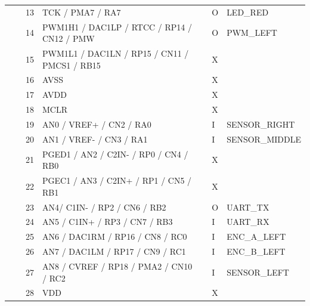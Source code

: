 \begin{table}[]
\begin{tabular}{
>{\columncolor[HTML]{B7B7B7}}c 
>{\columncolor[HTML]{EFEFEF}}c rllll}
\cellcolor[HTML]{B7B7B7} & \cellcolor[HTML]{EFEFEF} & 13 & TCK / PMA7 / RA7 & \cellcolor[HTML]{999999} & O & LED\_RED \\
\cellcolor[HTML]{B7B7B7} & \cellcolor[HTML]{EFEFEF} & 14 & \cellcolor[HTML]{D9EAD3}PWM1H1 / DAC1LP / RTCC / RP14 / CN12 / PMW &  & O & PWM\_LEFT \\
\cellcolor[HTML]{B7B7B7} & \cellcolor[HTML]{EFEFEF} & 15 & \cellcolor[HTML]{D9EAD3}PWM1L1 / DAC1LN / RP15 / CN11 / PMCS1 / RB15 &  & X &  \\
\cellcolor[HTML]{B7B7B7} & \cellcolor[HTML]{EFEFEF} & 16 & AVSS &  & X &  \\
\cellcolor[HTML]{B7B7B7} & \cellcolor[HTML]{EFEFEF} & 17 & AVDD &  & X &  \\
\cellcolor[HTML]{B7B7B7} & \cellcolor[HTML]{EFEFEF} & 18 & MCLR & \cellcolor[HTML]{999999} & X &  \\
\cellcolor[HTML]{B7B7B7} & \cellcolor[HTML]{EFEFEF} & 19 & \cellcolor[HTML]{C9DAF8}AN0 / VREF+ / CN2 / RA0 &  & I & SENSOR\_RIGHT \\
\cellcolor[HTML]{B7B7B7} & \cellcolor[HTML]{EFEFEF} & 20 & \cellcolor[HTML]{C9DAF8}AN1 / VREF- / CN3 / RA1 &  & I & SENSOR\_MIDDLE \\
\cellcolor[HTML]{B7B7B7} & \cellcolor[HTML]{EFEFEF} & 21 & \cellcolor[HTML]{C9DAF8}PGED1 / AN2 / C2IN- / RP0 / CN4 / RB0 &  & X &  \\
\cellcolor[HTML]{B7B7B7} & \multirow{-11}{*}{\cellcolor[HTML]{EFEFEF}B (top)} & 22 & \cellcolor[HTML]{C9DAF8}PGEC1 / AN3 / C2IN+ / RP1 / CN5 / RB1 &  & X &  \\
\cellcolor[HTML]{B7B7B7} & \cellcolor[HTML]{EFEFEF} & 23 & \cellcolor[HTML]{C9DAF8}AN4/ C1IN- / RP2 / CN6 / RB2 &  & O & UART\_TX \\
\cellcolor[HTML]{B7B7B7} & \cellcolor[HTML]{EFEFEF} & 24 & \cellcolor[HTML]{C9DAF8}AN5 / C1IN+ / RP3 / CN7 / RB3 &  & I & UART\_RX \\
\cellcolor[HTML]{B7B7B7} & \cellcolor[HTML]{EFEFEF} & 25 & \cellcolor[HTML]{C9DAF8}AN6 / DAC1RM / RP16 / CN8 / RC0 &  & I & ENC\_A\_LEFT \\
\cellcolor[HTML]{B7B7B7} & \cellcolor[HTML]{EFEFEF} & 26 & \cellcolor[HTML]{C9DAF8}AN7 / DAC1LM / RP17 / CN9 / RC1 &  & I & ENC\_B\_LEFT \\
\cellcolor[HTML]{B7B7B7} & \cellcolor[HTML]{EFEFEF} & 27 & \cellcolor[HTML]{C9DAF8}AN8 / CVREF / RP18 / PMA2 / CN10 / RC2 &  & I & SENSOR\_LEFT \\
\cellcolor[HTML]{B7B7B7} & \cellcolor[HTML]{EFEFEF} & 28 & VDD &  & X &  \\

\end{tabular}
\end{table}
